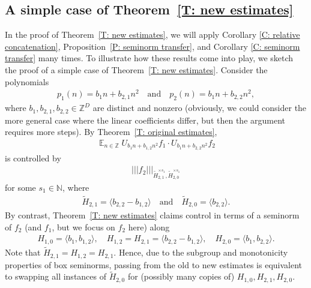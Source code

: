 \documentclass[11pt]{amsart}
\theoremstyle{definition}
\DeclareMathOperator*{\E}{\mathbb{E}}
\newcommand{\N}{{\mathbb N}}
\newcommand{\Z}{{\mathbb Z}}
\newcommand{\nnorm}[1]{\lvert\!|\!| #1|\!|\!\rvert}
\newcommand{\1}{{\mathbf{1}}}
\begin{document}
\subsection{A simple case of Theorem~\ref{T: new estimates}}\label{SS: seminorm example}
In the proof of Theorem~\ref{T: new estimates}, we will apply Corollary \ref{C: relative concatenation}, Proposition~\ref{P: seminorm transfer}, and Corollary \ref{C: seminorm transfer} many times. 
To illustrate how these results come into play, we sketch the proof of a simple case of Theorem~\ref{T: new estimates}.
    Consider the polynomials
    \begin{align*}
    p_1(n) = b_1 n + b_{2,1}n^2\quad \textrm{and}\quad p_2(n) = b_1 n + b_{2,2}n^2,    
    \end{align*}
    where $b_1, b_{2,1},b_{2,2}\in\Z^D$ are distinct and nonzero (obviously, we could consider the more general case where the linear coefficients differ, but then the argument requires more steps). By Theorem~\ref{T: original estimates}, 
        \begin{align}\label{E: original average in example}
        \E_{n\in\Z}U_{b_1 n+ b_{1,2} n^2}f_1\cdot U_{b_{1}n + b_{2,2}n^2}f_2
    \end{align}
    is controlled by 
    \begin{align}\label{E: original seminorm in example}
     \nnorm{f_2}_{\tilde H_{2,1}^{\times s_1},\tilde H_{2,0}^{\times s_1}}   
    \end{align}
    for some $s_1\in\N$, where
    \begin{align*}
        \tilde H_{2,1} = \langle b_{2,2}-b_{1,2}\rangle\quad \textrm{and}\quad \tilde H_{2,0} = \langle b_{2,2}\rangle.
    \end{align*}
    By contrast, Theorem~\ref{T: new estimates} claims control in terms of a seminorm of $f_2$ (and $f_1$, but we focus on $f_2$ here) along    
    \begin{align}\label{E: subgroups in new estimates example}
        H_{1,0} = \langle b_1, b_{1,2}\rangle,\quad H_{1,2} = H_{2,1} = \langle b_{2,2}-b_{1,2}\rangle,\quad H_{2,0} = \langle b_1, b_{2,2}\rangle. 
    \end{align}
    Note that $\tilde H_{2,1} = H_{1,2} = H_{2,1}$. Hence, due to the subgroup and monotonicity properties of box seminorms, passing from the old to new estimates is equivalent to swapping all instances of $\tilde H_{2,0}$ for (possibly many copies of) $H_{1,0}, H_{2,1}, H_{2,0}$. 
\end{document}

